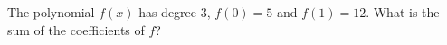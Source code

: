 The polynomial $f(x)$ has degree $3$, $f(0)=5$ and $f(1)=12$. What is the sum of the coefficients of $f$?
